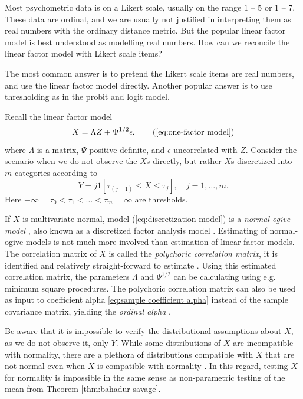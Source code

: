 Most psychometric data is on a Likert scale, usually on the range $1$ -- $5$ or $1$ -- $7$. These data are ordinal, and we are usually not justified in interpreting them as real numbers with the ordinary distance metric. But the popular linear factor model is best understood as modelling real numbers. How can we reconcile the linear factor model with Likert scale items?

The most common answer is to pretend the Likert scale items are real numbers, and use the linear factor model directly. Another popular answer is to use thresholding as in the probit and logit model.  

Recall the linear factor model
\begin{equation}
X=\Lambda Z+\Psi^{1/2}\epsilon,      \tag{\ref{eq:one-factor model}}
\end{equation}
where $\Lambda$ is a matrix, $\Psi$ positive definite, and $\epsilon$ uncorrelated with $Z$. Consider the scenario when we do not observe the $X$s directly, but rather $X$s discretized into $m$ categories according to
\begin{equation}
Y=j1[\tau_{(j-1)}\leq X\leq\tau_{j}],\quad j = 1, \ldots,m. \label{eq:discretization model}
\end{equation}
Here $-\infty=\tau_{0}<\tau_{1}<\ldots<\tau_{m}=\infty$
are thresholds.

If $X$ is multivariate normal, model (\ref{eq:discretization model})
is a \textit{normal-ogive model} \parencite{Swaminathan2016-rg}, also known as a discretized factor analysis model \parencite{Takane1987-pq}. Estimating of normal-ogive models is not much more involved than estimation of linear factor models. The correlation matrix of $X$ is called the \textit{polychoric correlation matrix}, it is identified and relatively straight-forward to estimate \parencite{Olsson1979-ti}. Using this estimated correlation matrix, the parameters $\Lambda$ and $\Psi^{1/2}$ can be calculating using e.g. minimum square procedures. The polychoric correlation matrix can also be used as input to coefficient alpha \eqref{eq:sample coefficient alpha} instead of the sample covariance matrix, yielding the \textit{ordinal alpha} \parencite{Zumbo2007-ap}. 

Be aware that it is impossible to verify the distributional assumptions about $X$, as we do not observe it, only $Y$. While some distributions of $X$ are incompatible with normality, there are a plethora of distributions compatible with $X$ that are not normal even when $X$ is compatible with normality \parencite{Foldnes2020-ma}. In this regard, testing $X$ for normality is impossible in the same sense as non-parametric testing of the mean from Theorem \ref{thm:bahadur-savage}.